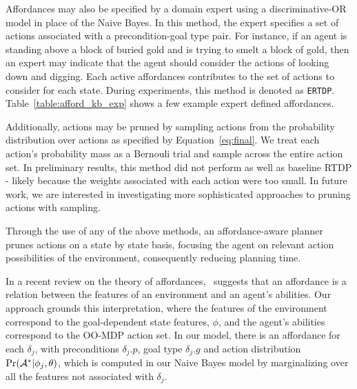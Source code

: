 \documentclass[letterpaper]{article}
\begin{document}
Affordances may also be specified by a domain expert using a discriminative-OR model in place of the Naive Bayes. In this method, the expert specifies a set of actions associated with a precondition-goal type pair. For instance, if an agent is standing above a block of buried gold and is trying to smelt a block of gold, then an expert may indicate that the agent should consider the actions of looking down and digging. Each active affordances contributes to the set of actions to consider for each state. During experiments, this method is denoted as \texttt{ERTDP}. Table~\ref{table:afford_kb_exp} shows a few example expert defined affordances.

Additionally, actions may be pruned by sampling actions from the probability distribution over actions as specified by Equation~\ref{eq:final}. We treat each action's probability mass as a Bernouli trial and sample across the entire action set. In preliminary results, this method did not perform as well as baseline RTDP - likely because the weights associated with each action were too small. In future work, we are interested in investigating more sophisticated approaches to pruning actions with sampling. 

Through the use of any of the above methods, an affordance-aware planner prunes actions
on a state by state basis, focusing the agent on relevant action possibilities of the environment,
consequently reducing planning time.

In a recent review on the theory of affordances,~\citet{chemero2003} suggests that an affordance
is a relation between the features of an environment and an agent's abilities. Our approach
grounds this interpretation, where the features of the environment correspond to the goal-dependent
state features, $\phi$, and the agent's abilities correspond to the OO-MDP action set. In our model,
there is an affordance for each $\delta_j$, with preconditions $\delta_j.p$, goal type $\delta_j.g$ and
action distribution $\Pr({\cal A}^* | \phi_j, \theta)$, which is computed in our Naive Bayes model by
marginalizing over all the features not associated with $\delta_j$.
  
\end{document}
